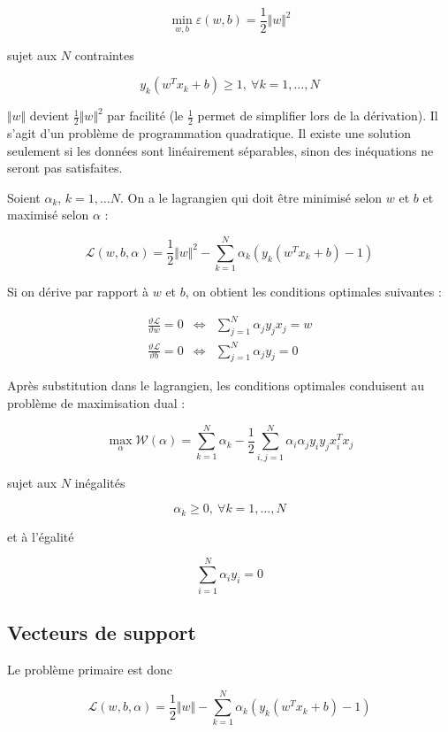 	$$\min_{w, b} \varepsilon(w, b) = \frac{1}{2} \Vert w \Vert^2$$
	
	sujet aux $N$ contraintes
	
	$$y_k(w^T x_k + b) \geq 1, \: \forall k = 1, \dots , N$$

	$\Vert w \Vert$ devient $\frac{1}{2} \Vert w \Vert^2$ par facilité (le $\frac{1}{2}$ permet de simplifier lors de la dérivation). Il s'agit d'un problème de programmation quadratique. Il existe une solution seulement si les données sont linéairement séparables, sinon des inéquations ne seront pas satisfaites.
	
	
	Soient $\alpha_k$, $k = 1, \dots N$. On a le lagrangien qui doit être minimisé selon $w$ et $b$ et maximisé selon $\alpha$ :
	
	$$\mathcal{L}(w, b, \alpha) = \frac{1}{2} \Vert w \Vert^2 - \sum_{k = 1}^N \alpha_k (y_k (w^Tx_k + b) - 1)$$
	
	Si on dérive par rapport à $w$ et $b$, on obtient les conditions optimales suivantes :
	
	\begin{eqnarray*}
	\frac{\vartheta \mathcal{L}}{\vartheta w} = 0 & \Leftrightarrow & \sum_{j = 1}^N \alpha_j y_j x_j = w \\
	\frac{\vartheta \mathcal{L}}{\vartheta b} = 0 & \Leftrightarrow & \sum_{j = 1}^N \alpha_j y_j = 0
	\end{eqnarray*}
	
	Après substitution dans le lagrangien, les conditions optimales conduisent au problème de maximisation dual :
	
	$$\max_{\alpha} \mathcal{W}(\alpha) = \sum_{k = 1}^N \alpha_k - \frac{1}{2} \sum_{i, j = 1}^N \alpha_i \alpha_j y_i y_j x_i^T x_j$$
	
	sujet aux $N$ inégalités
	
	$$\alpha_k \geq 0, \: \forall k = 1, \dots, N$$
	
	et à l'égalité
	
	$$\sum_{i = 1}^N \alpha_i y_i = 0$$
	
	
	\subsection{Vecteurs de support}
	
	Le problème primaire est donc
	
	$$\mathcal{L}(w, b, \alpha) = \frac{1}{2} \Vert w \Vert - \sum_{k = 1}^N \alpha_k (y_k (w^Tx_k + b) - 1)$$
	
